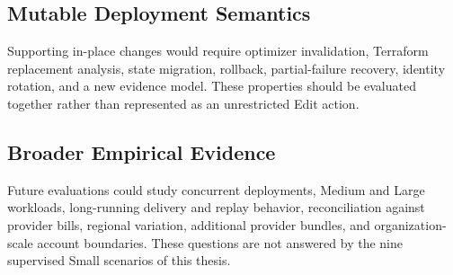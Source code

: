 \subsection{Mutable Deployment Semantics}

Supporting in-place changes would require optimizer invalidation, Terraform
replacement analysis, state migration, rollback, partial-failure recovery,
identity rotation, and a new evidence model. These properties should be
evaluated together rather than represented as an unrestricted Edit action.

\subsection{Broader Empirical Evidence}

Future evaluations could study concurrent deployments, Medium and Large
workloads, long-running delivery and replay behavior, reconciliation against
provider bills, regional variation, additional provider bundles, and
organization-scale account boundaries. These questions are not answered by
the nine supervised Small scenarios of this thesis.
